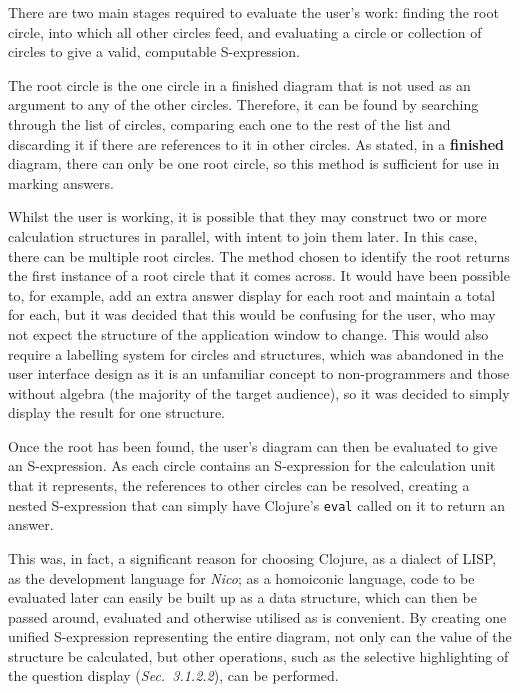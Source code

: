 \documentclass[12pt,twoside,notitlepage,xetex]{report}
\begin{document}
There are two main stages required to evaluate the user's work: finding the root circle, into which all other circles feed, and evaluating a circle or collection of circles to give a valid, computable S-expression.

The root circle is the one circle in a finished diagram that is not used as an argument to any of the other circles.  Therefore, it can be found by searching through the list of circles, comparing each one to the rest of the list and discarding it if there are references to it in other circles.  As stated, in a {\bf finished} diagram, there can only be one root circle, so this method is sufficient for use in marking answers.

Whilst the user is working, it is possible that they may construct two or more calculation structures in parallel, with intent to join them later.  In this case, there can be multiple root circles.  The method chosen to identify the root returns the first instance of a root circle that it comes across.  It would have been possible to, for example, add an extra answer display for each root and maintain a total for each, but it was decided that this would be confusing for the user, who may not expect the structure of the application window to change.  This would also require a labelling system for circles and structures, which was abandoned in the user interface design as it is an unfamiliar concept to non-programmers and those without algebra (the majority of the target audience), so it was decided to simply display the result for one structure.

Once the root has been found, the user's diagram can then be evaluated to give an S-expression.  As each circle contains an S-expression for the calculation unit that it represents, the references to other circles can be resolved, creating a nested S-expression that can simply have Clojure's \verb¬eval¬ called on it to return an answer.

This was, in fact, a significant reason for choosing Clojure, as a dialect of LISP, as the development language for \emph{Nico}; as a homoiconic language, code to be evaluated later can easily be built up as a data structure, which can then be passed around, evaluated and otherwise utilised as is convenient.  By creating one unified S-expression representing the entire diagram, not only can the value of the structure be calculated, but other operations, such as the selective highlighting of the question display (\emph{Sec.~3.1.2.2}), can be performed.
\end{document}
